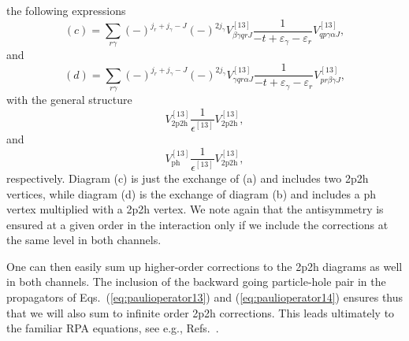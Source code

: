 \documentclass{article}
\begin{document}
the following expressions
\begin{equation}
      (c)=\sum_{r\gamma}(-)^{j_r+j_{\gamma}-J}
      (-)^{2j_{\gamma}}
      V^{[13]}_{\beta\gamma qr J}
      \frac{1}{-t+\varepsilon_{\gamma}-
                \varepsilon_{r}} V^{[13]}_{qp\gamma\alpha J},
       \label{eq:2p2hc}
\end{equation}
and
\begin{equation}
      (d)=\sum_{r\gamma}(-)^{j_r+j_{\gamma}-J}
      (-)^{2j_{\gamma}}
      V^{[13]}_{\gamma q r\alpha J}
      \frac{1}{-t+\varepsilon_{\gamma}-
                \varepsilon_{r}} V^{[13]}_{pr\beta\gamma J},
       \label{eq:2p2hd}
\end{equation}
with the general structure
\begin{equation}
    V_{\mathrm{2p2h}}^{[13]}
     \frac{1}{\epsilon^{[13]}}
     V_{\mathrm{2p2h}}^{[13]},
\end{equation}
and
\begin{equation}
    V_{\mathrm{ph}}^{[13]}
     \frac{1}{\epsilon^{[13]}}
     V_{\mathrm{2p2h}}^{[13]},
\end{equation}
respectively. Diagram (c) is just the exchange of (a)
and includes two 2p2h vertices, while diagram (d) is the exchange
of diagram (b) and includes a ph vertex multiplied with
a 2p2h vertex. We note again that the antisymmetry is
ensured at a given order in the interaction only
if we include the corrections at the same level in both
channels.

One can then easily sum up higher-order corrections
to the 2p2h diagrams as well in both channels.
The inclusion of the backward going particle-hole
pair in the propagators of Eqs.\ (\ref{eq:paulioperator13})
and (\ref{eq:paulioperator14}) ensures thus that we will
also sum to infinite order 2p2h corrections.
This leads ultimately to the familiar RPA equations,
see e.g., Refs.\ \cite{eo77}.
\end{document}

